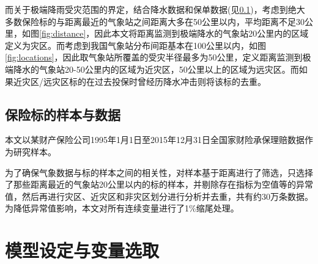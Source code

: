 而关于极端降雨受灾范围的界定，结合降水数据和保单数据(见\ref{sec:data})，考虑到绝大多数保险标的与距离最近的气象站之间距离大多在50公里以内，平均距离不足30公里，如图\ref{fig:distance}，因此本文将距离监测到极端降水的气象站20公里内的区域定义为灾区。而考虑到我国气象站分布间距基本在100公里以内，如图\ref{fig:locations}，因此取气象站所覆盖的受灾半径最多为50公里，定义距离监测到极端降水的气象站20-50公里内的区域为近灾区，50公里以上的区域为远灾区。而如果近灾区/远灾区标的在过去投保时曾经历降水冲击则将该标的去重。


\subsection{保险标的样本与数据}\label{sec:data}
本文以某财产保险公司1995年1月1日至2015年12月31日全国家财险承保理赔数据作为研究样本。

为了确保气象数据与标的样本之间的相关性，对样本基于距离进行了筛选，只选择了那些距离最近的气象站20公里以内的标的样本，并剔除存在指标为空值等的异常值，然后再进行灾区、近灾区和非灾区划分进行分析并去重，共有约30万条数据。为降低异常值影响，本文对所有连续变量进行了1\%缩尾处理。

\section{模型设定与变量选取}

